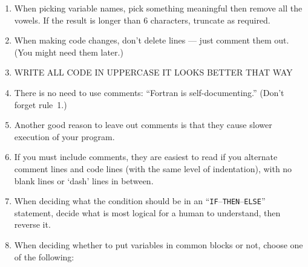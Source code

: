 \documentclass[12pt,letterpaper]{article}
\begin{document}
\begin{enumerate}
\item When picking variable names, pick something meaningful then remove all 
   the vowels.  If the result is longer than 6 characters, truncate as 
   required.
\item When making code changes, don't delete lines --- just comment them out.
   (You might need them later.)
\item {\ttfamily WRITE ALL CODE IN UPPERCASE IT LOOKS BETTER THAT WAY}
\item There is no need to use comments:
``Fortran is self-documenting.'' (Don't forget rule~1.)
\item Another good reason to leave out comments is that they cause slower
   execution of your program.
\item If you must include comments, they are easiest to read if you alternate
   comment lines and code lines (with the same level of indentation), with 
   no blank lines or `dash' lines in between.
\item When deciding what the condition should be in an
``\texttt{IF}--\texttt{THEN}--\texttt{ELSE}'' statement, decide what is most logical for a
human to understand, then reverse it.
\item When deciding whether to put variables in common blocks or not, choose
   one of the following:%


\end{enumerate}
\end{document}
